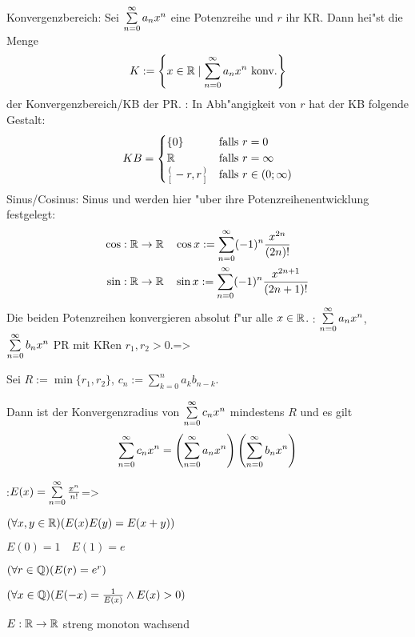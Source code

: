  Konvergenzbereich:{
  Sei $\sumn 0 a_n x^n$ eine Potenzreihe und $r$ ihr KR. Dann hei"st die Menge 
  \[K:=\left\{x\in\SetR\mid\sumn 0 a_n x^n \text{ konv.} \right\}
    \]
  der Konvergenzbereich/KB der PR.
  }
\remark:{
  In Abh"angigkeit von $r$ hat der KB folgende Gestalt:
  \[KB=\begin{cases}
      \{0\}                     	& \text{falls $r=0$} \\
      \SetR                     	& \text{falls $r=\infty$} \\
      \stack({(};[)-r,r\stack({)};])    & \text{falls $r\in(0;\infty)$}
      \end{cases}
    \]
  }
 Sinus/Cosinus:{
  Sinus und  werden hier "uber ihre 
  Potenzreihenentwicklung festgelegt:
  \begin{align*}
    \cos:\SetR\to\SetR &\quad \cos x:=\sumn 0 (-1)^n \frac{x^{2n}}{(2n)!}\\
    \sin:\SetR\to\SetR &\quad \sin x:=\sumn 0 (-1)^n \frac{x^{2n+1}}{(2n+1)!}
    \end{align*}
  Die beiden Potenzreihen konvergieren absolut f"ur alle $x\in\mathbb R$.
  }
\theorem:
  $\sumn 0 a_n x^n$,$\sumn 0 b_n x^n$ PR mit KRen $r_1,r_2>0$.=>{
  Sei $R:=\min\{r_1,r_2\}$, $c_n:=\sum_{k=0}^n a_k b_{n-k}$.
  
  Dann ist der Konvergenzradius von $\sumn 0 c_n x^n$ mindestens $R$ und
  es gilt
  \[\sumn 0 c_n x^n=\left(\sumn 0 a_n x^n\right)\left(\sumn 0 b_n x^n\right)
    \]
  }
\theorem:$E(x)=\sumn 0 \frac{x^n}{n!}$=>{
  \begin{stmts}
    \item $(\forall x,y\in\mathbb R)(E(x)E(y)=E(x+y))$ 
    \item $E(0)=1 \quad E(1)=e$ 
    \item $(\forall r\in\mathbb Q)(E(r)=e^r)$ 
    \item $(\forall x\in\mathbb Q)(E(-x)=\frac{1}{E(x)} \land E(x)>0)$ 
    \item $E:\mathbb R\to\mathbb R$ streng monoton wachsend 
    \end{stmts}
  }
